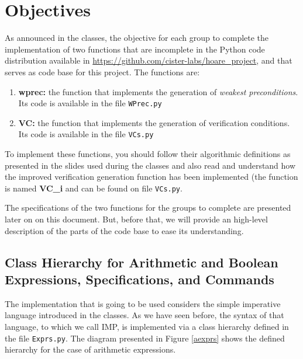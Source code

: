 \documentclass[11pt]{article}
\begin{document}
\newcommand{\compn}[1]{\textsf{\textcolor{purple}{#1}}\xspace}
\newcommand{\chn}[1]{\textsf{\textcolor{teal}{#1}}\xspace}

\section{Objectives}

As announced in the classes, the objective for each group to complete the implementation of two functions that are incomplete in the Python code distribution available in \url{https://github.com/cister-labs/hoare_project}, and that serves as code base for this project. The functions are:\\

\begin{enumerate}
  \item \textbf{wprec:} the function that implements the generation of \textit{weakest preconditions}. Its code is available in the file \texttt{WPrec.py}
  \item \textbf{VC:} the function that implements the generation of verification conditions. Its code is available in the file \texttt{VCs.py}
\end{enumerate}

To implement these functions, you should follow their algorithmic definitions as presented in the slides used during the classes and also read and understand how the improved verification generation function has been implemented (the function is named \textbf{VC\_i} and can be found on file \texttt{VCs.py}. 

The specifications of the two functions for the groups to complete are presented later on on this document. But, before that, we will provide an high-level description of the parts of the code base to ease its understanding.

\subsection{Class Hierarchy for Arithmetic and Boolean Expressions, Specifications, and Commands}

The implementation that is going to be used considers the simple imperative language introduced in the classes. As we have seen before, the syntax of that language, to which we call IMP, is implemented via a class hierarchy defined in the file \texttt{Exprs.py}. The diagram presented in Figure \ref{aexprs} shows the defined hierarchy for the case of arithmetic expressions.
\end{document}
